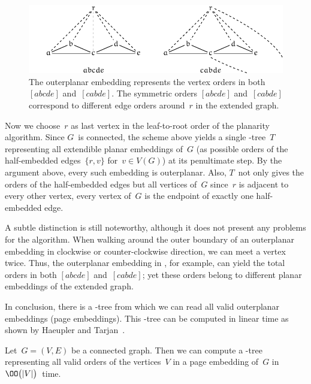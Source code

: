 \begin{figure}[\placement]
    \centering
    \includegraphics[scale=.9]{figures/t_subtle}
    \caption[Outerplanar embedding representing different symmetric orders]{The outerplanar embedding  
    represents the vertex orders in both $[abcde]$ and~$[cabde]$. The symmetric orders $[abcde]$ and~$[cabde]$ correspond to different edge orders around~$r$ in the extended graph.}
    \label{figure:subtle}
\end{figure}
    
Now we choose~$r$ as last vertex in the leaf-to-root order of the planarity algorithm.
Since $G$~is connected, the scheme above yields a single \PQ-tree~$T$ representing all
extendible planar embeddings of~$G$ (as possible orders of the half-embedded edges~$\{r, v\}$ for~$v\in V(G)$)  at its penultimate step. By the argument above, every such embedding
is outerplanar. Also, $T$~not only gives the orders of the half-embedded edges
but all vertices of~$G$ since~$r$ is adjacent to every other vertex, \ie every vertex of~$G$ is 
the endpoint of exactly one half-embedded edge. 

A subtle distinction is still noteworthy, although it does not present any problems
for the algorithm. When
walking around the outer boundary of an outerplanar embedding in clockwise or counter-clockwise
direction, we can meet a vertex twice. Thus, the outerplanar embedding in ,
for example, can yield the total orders in both $[abcde]$ and~$[cabde]$; yet these orders belong
to different planar embeddings of the extended graph.

In conclusion, there is a \PQ-tree from which we can read all valid outerplanar embeddings (page embeddings). 
This \PQ-tree can be computed in linear time as shown by Haeupler and Tarjan~\cite{Haeupler08}.

\begin{lemma}\label{lemma:one-page}
Let~$G = (V, E)$ be a connected graph. Then we can compute a \PQ-tree representing all valid
orders of the vertices~$V$ in a page embedding of~$G$ in $\OO\bigl(|V|\bigr)$~time.
\end{lemma}

